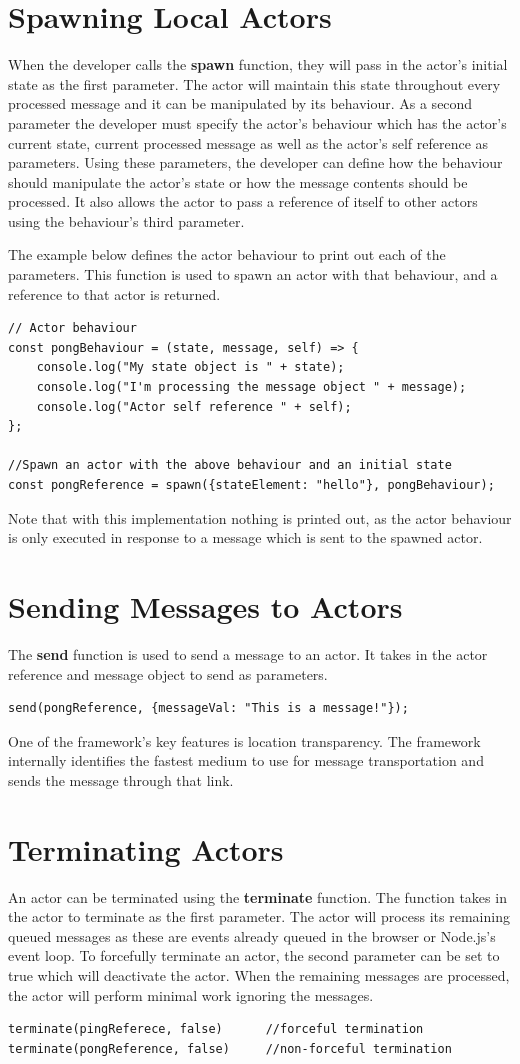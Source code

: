 \documentclass[oneside]{um-fict}
\begin{document}
\section{Spawning Local Actors}
When the developer calls the \textbf{spawn} function, they will pass in the actor's initial state as the first parameter. The actor will maintain this state throughout every processed message and it can be manipulated by its behaviour. As a second parameter the developer must specify the actor's behaviour which has the actor's current state, current processed message as well as the actor's self reference as parameters. Using these parameters, the developer can define how the behaviour should manipulate the actor's state or how the message contents should be processed. It also allows the actor to pass a reference of itself to other actors using the behaviour's third parameter.

The example below defines the actor behaviour to print out each of the parameters. This function is used to spawn an actor with that behaviour, and a reference to that actor is returned.
\newpage
\begin{lstlisting}
// Actor behaviour
const pongBehaviour = (state, message, self) => {
    console.log("My state object is " + state);
    console.log("I'm processing the message object " + message);
    console.log("Actor self reference " + self);
};

//Spawn an actor with the above behaviour and an initial state
const pongReference = spawn({stateElement: "hello"}, pongBehaviour);
\end{lstlisting}
Note that with this implementation nothing is printed out, as the actor behaviour is only executed in response to a message which is sent to the spawned actor.
\section{Sending Messages to Actors}
The \textbf{send} function is used to send a message to an actor. It takes in the actor reference and message object to send as parameters.
\begin{lstlisting}
send(pongReference, {messageVal: "This is a message!"});
\end{lstlisting}
One of the framework's key features is location transparency. The framework internally identifies the fastest medium to use for message transportation and sends the message through that link.
\section{Terminating Actors}
An actor can be terminated using the \textbf{terminate} function. The function takes in the actor to terminate as the first parameter. The actor will process its remaining queued messages as these are events already queued in the browser or Node.js's event loop. To forcefully terminate an actor, the second parameter can be set to true which will deactivate the actor. When the remaining messages are processed, the actor will perform minimal work ignoring the messages.
\begin{lstlisting}
terminate(pingReferece, false)      //forceful termination
terminate(pongReference, false)     //non-forceful termination
\end{lstlisting}
\end{document}
